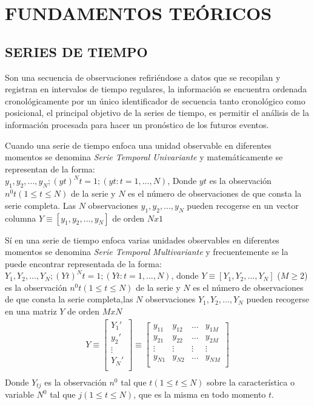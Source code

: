 \chapter{FUNDAMENTOS TEÓRICOS}

\section{SERIES DE TIEMPO}

Son una secuencia de observaciones refiriéndose a datos que se recopilan y registran en intervalos de tiempo regulares, 
la información se encuentra ordenada cronológicamente por un único identificador de secuencia tanto cronológico como posicional,
el principal objetivo de la series de tiempo, es permitir el análisis de la información procesada para hacer un pronóstico 
de los futuros eventos.

Cuando una serie de tiempo enfoca una unidad observable en diferentes momentos se denomina \textit{Serie Temporal Univariante} y matemáticamente 
se representan de la forma: \\
${y_1,y_2,...,y_N; {(yt)^N} t=1; (yt : t=1,...,N)}$, Donde $yt$ es la observación $n^0 t (1 \leq t \leq N)$ de la serie y $N$ es el número de observaciones de que 
consta la serie completa. Las $N$ observaciones $y_1,y_2,...,y_N$ pueden recogerse en un vector columna $Y \equiv [y_1,y_2,...,y_N]$ de orden $Nx1$

Sí en una serie de tiempo enfoca varias unidades observables en diferentes momentos se denomina \textit{Serie Temporal Multivariante} y frecuentemente se la puede 
encontrar representada de la forma: \\
${Y_1,Y_2,...,Y_N; {(Yt)^N} t=1; (Yt : t=1,...,N)}$, donde $Y \equiv [Y_1,Y_2,...,Y_N]$ ($M\geq2$) es la observación $n^0 t (1 \leq t \leq N)$ de la serie 
y $N$ es el número de observaciones de que consta la serie completa,las $N$ observaciones $Y_1,Y_2,...,Y_N$ pueden recogerse en una matriz $Y$ de orden $MxN$
\begin{gather*}
Y \equiv
\begin{bmatrix}
Y_1' \\
y_2' \\
\vdots \\
Y_N' \\
\end{bmatrix}
\equiv
\begin{bmatrix}
y_{11} & y_{12} & ... & y_{1M} \\
y_{21} & y_{22} & ... & y_{2M} \\
\vdots & \vdots & \vdots & \vdots \\
y_{N1} & y_{N2} & ... & y_{NM} \\
\end{bmatrix}
\\
\end{gather*}
Donde $Y_{tj}$ es la observación $n^0$ tal que $t (1 \leq t \leq N)$ sobre la característica o variable $N^0$ tal que $j(1 \leq t \leq N)$, que es la misma 
en todo momento $t$.\\

